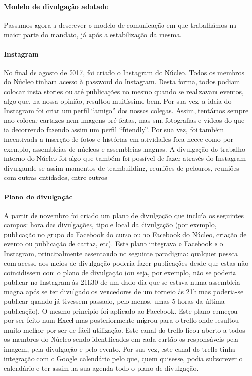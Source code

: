 \paragraph{Modelo de divulgação adotado}
Passamos agora a descrever o modelo de comunicação em que trabalhámos na maior parte do mandato, já após a estabilização da mesma.

\paragraph{Instagram}
No final de agosto de 2017, foi criado o Instagram do Núcleo. Todos os membros do Núcleo tinham acesso à password do Instagram. Desta forma, todos podiam colocar insta stories ou até publicações no mesmo quando se realizavam eventos, algo que, na nossa opinião, resultou muitíssimo bem. Por sua vez, a ideia do Instagram foi criar um perfil “amigo” dos nossos colegas. Assim, tentámos sempre não colocar cartazes nem imagens pré-feitas, mas sim fotografias e vídeos do que ia decorrendo fazendo assim um perfil “friendly”. Por sua vez, foi também incentivada a inserção de fotos e histórias em atividades fora \acrshort{neeec} como por exemplo, assembleias de núcleos e assembleias magnas. A divulgação do trabalho interno do Núcleo foi algo que também foi possível de fazer através do Instagram divulgando-se assim momentos de teambuilding, reuniões de pelouros, reuniões com outras entidades, entre outros.

\paragraph{Plano de divulgação}
A partir de novembro foi criado um plano de divulgação que incluía os seguintes campos: hora das divulgações, tipo e local da divulgação (por exemplo, publicação no grupo do Facebook do curso ou no Facebook do Núcleo, criação de evento ou publicação de cartaz, etc). Este plano integrava o Facebook e o Instagram, principalmente assentando no seguinte paradigma: qualquer pessoa com acesso aos meios de divulgação poderia fazer publicações desde que estas não coincidissem com o plano de divulgação (ou seja, por exemplo, não se poderia publicar no Instagram às 21h30 de um dado dia que se estava numa assembleia magna após se ter divulgado os vencedores de um torneio às 21h mas poderia-se publicar quando já tivessem passado, pelo menos, umas 5 horas da última publicação). O mesmo principio foi aplicado ao Facebook. Este plano começou por ser feito num Excel mas posteriormente migrou para o trello onde resultou muito melhor por ser de fácil utilização. Este canal do trello ficou aberto a todos os membros do Núcleo sendo identificados em cada cartão os responsáveis pela imagem, pela divulgação e pelo evento. Por sua vez, este canal do trello tinha integração com o Google calendário pelo que, quem quisesse, podia subscrever o calendário e ter assim na sua agenda todo o plano de divulgação.

